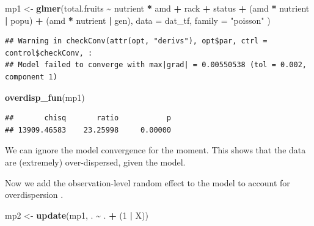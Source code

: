 \documentclass[
  12pt,
]{book}
\newenvironment{Shaded}{\begin{snugshade}}{\end{snugshade}}
\newcommand{\DataTypeTok}[1]{\textcolor[rgb]{0.13,0.29,0.53}{#1}}
\newcommand{\DecValTok}[1]{\textcolor[rgb]{0.00,0.00,0.81}{#1}}
\newcommand{\KeywordTok}[1]{\textcolor[rgb]{0.13,0.29,0.53}{\textbf{#1}}}
\newcommand{\NormalTok}[1]{#1}
\newcommand{\OperatorTok}[1]{\textcolor[rgb]{0.81,0.36,0.00}{\textbf{#1}}}
\newcommand{\StringTok}[1]{\textcolor[rgb]{0.31,0.60,0.02}{#1}}
\begin{document}
\begin{Shaded}
\begin{Highlighting}[]
\NormalTok{mp1 \textless{}{-}}\StringTok{ }\KeywordTok{glmer}\NormalTok{(total.fruits }\OperatorTok{\textasciitilde{}}\StringTok{ }\NormalTok{nutrient }\OperatorTok{*}\StringTok{ }\NormalTok{amd }\OperatorTok{+}
\StringTok{  }\NormalTok{rack }\OperatorTok{+}\StringTok{ }\NormalTok{status }\OperatorTok{+}
\StringTok{  }\NormalTok{(amd }\OperatorTok{*}\StringTok{ }\NormalTok{nutrient }\OperatorTok{|}\StringTok{ }\NormalTok{popu) }\OperatorTok{+}
\StringTok{  }\NormalTok{(amd }\OperatorTok{*}\StringTok{ }\NormalTok{nutrient }\OperatorTok{|}\StringTok{ }\NormalTok{gen),}
\DataTypeTok{data =}\NormalTok{ dat\_tf, }\DataTypeTok{family =} \StringTok{"poisson"}
\NormalTok{)}
\end{Highlighting}
\end{Shaded}

\begin{verbatim}
## Warning in checkConv(attr(opt, "derivs"), opt$par, ctrl = control$checkConv, :
## Model failed to converge with max|grad| = 0.00550538 (tol = 0.002, component 1)
\end{verbatim}

\begin{Shaded}
\begin{Highlighting}[]
\KeywordTok{overdisp\_fun}\NormalTok{(mp1)}
\end{Highlighting}
\end{Shaded}

\begin{verbatim}
##       chisq       ratio           p 
## 13909.46583    23.25998     0.00000
\end{verbatim}

We can ignore the model convergence for the moment. This shows that the data are (extremely) over-dispersed, given the model.

Now we add the observation-level random effect to the model to account for overdispersion \citep{elston2001}.

\begin{Shaded}
\begin{Highlighting}[]
\NormalTok{mp2 \textless{}{-}}\StringTok{ }\KeywordTok{update}\NormalTok{(mp1, . }\OperatorTok{\textasciitilde{}}\StringTok{ }\NormalTok{. }\OperatorTok{+}\StringTok{ }\NormalTok{(}\DecValTok{1} \OperatorTok{|}\StringTok{ }\NormalTok{X))}
\end{Highlighting}
\end{Shaded}
\end{document}
